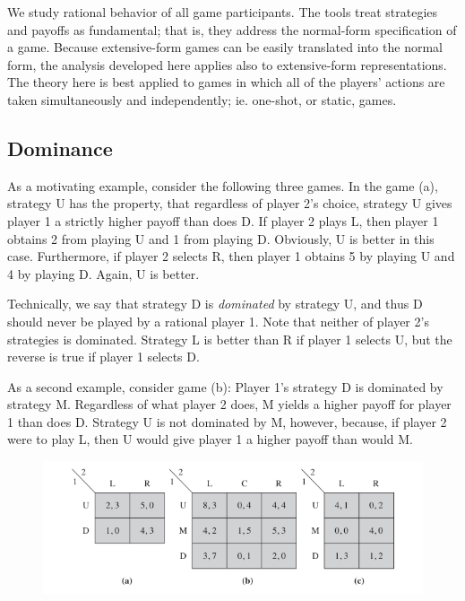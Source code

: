 
We study rational behavior of all game participants. The tools treat strategies and payoffs as fundamental; that is, they address the normal-form specification of a game. Because extensive-form games can be easily translated into the normal form, the analysis developed here applies also to extensive-form representations. The theory here is best applied to games in which all of the players’ actions are taken simultaneously and independently; ie. one-shot, or static, games.

\subsection{Dominance}

As a motivating example, consider the following three games. In the game (a), strategy U has the property, that regardless of player 2’s choice, strategy U gives player 1 a strictly higher payoff than does D. If player 2 plays L, then player 1 obtains 2 from playing U and 1 from playing D. Obviously, U is better in this case. Furthermore, if player 2 selects R, then player 1 obtains 5 by playing U and 4 by playing D. Again, U is better.

Technically, we say that strategy D is \emph{dominated} by strategy U, and thus D should never be played by a rational player 1. Note that neither of player 2’s strategies is dominated. Strategy L is better than R if player 1 selects U, but the reverse is true if player 1 selects D.

As a second example, consider game (b): Player 1’s strategy D is dominated by strategy M. Regardless of what player 2 does, M yields a higher payoff for player 1 than does D. Strategy U is not dominated by M, however, because, if player 2 were to play L, then U would give player 1 a higher payoff than would M.

\begin{figure}[H]
    \centering
    \includegraphics[scale=0.7]{images/2023-11-21-game_theory_01.png}
\end{figure}

